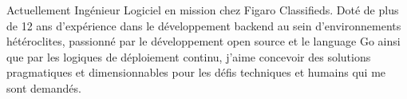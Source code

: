 

\begin{cvparagraph}

Actuellement Ingénieur Logiciel en mission chez Figaro Classifieds. \newline Doté de plus de 12 ans
d'expérience dans le développement backend au sein d'environnements hétéroclites, passionné par le 
développement open source et le language Go ainsi que par les logiques de déploiement continu, j'aime 
concevoir des solutions pragmatiques et dimensionnables pour les défis techniques et humains qui me sont demandés.
\end{cvparagraph}
